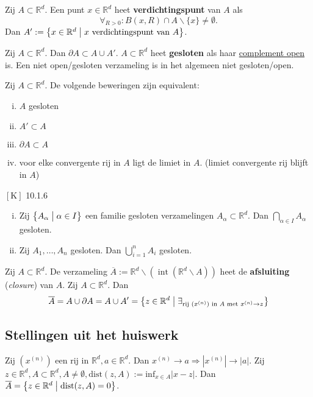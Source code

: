 \documentclass[a4paper]{exam}
\theoremstyle{definition}
\DeclareMathOperator{\intr}{int}
\begin{document}
		 Zij $A \subset \mathbb{R}^d$. Een punt $x \in \mathbb{R}^d$ heet \textbf{verdichtingspunt} van $A$ als \[\forall _{R>0}:B(x,R)\cap  A \backslash\{x\} \neq \emptyset.\]
			Dan $A':=\big\{ x \in \mathbb{R}^d \bigm| x \text{ verdichtingspunt van } A\big\}$.
		
		\lemma Zij $A \subset \mathbb{R}^d$. Dan $\partial A \subset A\cup A'$.
		 $A \subset \mathbb{R}^d$ heet \textbf{gesloten} als haar \underline{complement open} is.
		\valkuil Een niet open/gesloten verzameling is in het algemeen niet gesloten/open.
		
		 Zij $A \subset \mathbb{R}^d$. De volgende beweringen zijn equivalent:
			\begin{enumerate}[(i)]
				\item $A$ gesloten
				\item $A'\subset A$
				\item $\partial A \subset A$
				\item voor elke convergente rij in $A$ ligt de limiet in $A$. (limiet convergente rij blijft in $A$)
			\end{enumerate}
		
		\theorem $\left[\text{K}\right]$ 10.1.6
			\begin{enumerate}[(i)]
				\item Zij $\big\{ A_\alpha \bigm| \alpha \in I \big\}$ een familie gesloten verzamelingen $A_\alpha \subset \mathbb{R}^d$. Dan $\bigcap_{\alpha \in I}A_\alpha$ gesloten.
				\item Zij $A_1, \dots ,A_n$ gesloten. Dan $\bigcup_{i=1}^n A_i$ gesloten.
			\end{enumerate}
		
		 Zij $A \subset \mathbb{R}^d$. De verzameling $\overline{A}:= \mathbb{R}^d \backslash (\intr (\mathbb{R}^d \backslash A))$ heet de \textbf{afsluiting} (\textit{closure}) van $A$.
			  Zij $A \subset \mathbb{R}^d$. Dan
			\[\overline{A}= A \cup \partial A = A \cup A'= \big\{z \in \mathbb{R}^d \bigm| \exists _{\text{rij } (x^{(n)}) \text{ in } A \text{ met } x^{(n)} \rightarrow z} \big\}\]
	
	\subsection{Stellingen uit het huiswerk}
		\theorem Zij $(x^{(n)})$ een rij in $\mathbb{R}^d, a \in \mathbb{R}^d$. Dan $x^{(n)}\rightarrow a \Rightarrow |x^{(n)}|\rightarrow |a|.$
		\theorem Zij $z \in \mathbb{R}^d, A \subset \mathbb{R}^d, A \neq \emptyset, \text{dist}(z,A) := \text{inf}_{x\in A}|x-z|$.
		  Dan $\overline{A}=\big\{z\in \mathbb{R}^d \bigm| \text{dist}(z,A)=0\big\}$.
\newpage
\end{document}

